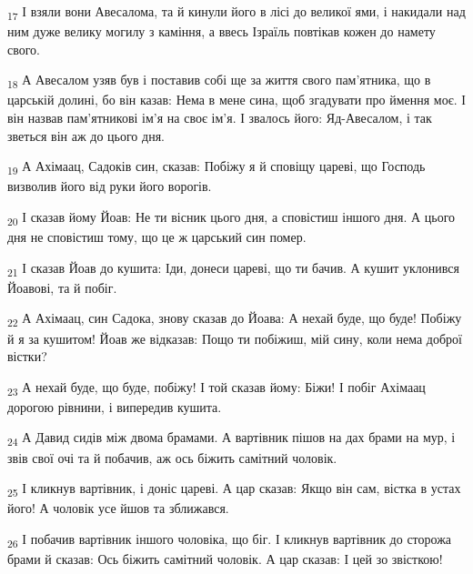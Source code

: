 \begin{tcolorbox}
\textsubscript{17} І взяли вони Авесалома, та й кинули його в лісі до великої ями, і накидали над ним дуже велику могилу з каміння, а ввесь Ізраїль повтікав кожен до намету свого.
\end{tcolorbox}
\begin{tcolorbox}
\textsubscript{18} А Авесалом узяв був і поставив собі ще за життя свого пам'ятника, що в царській долині, бо він казав: Нема в мене сина, щоб згадувати про ймення моє. І він назвав пам'ятникові ім'я на своє ім'я. І звалось його: Яд-Авесалом, і так зветься він аж до цього дня.
\end{tcolorbox}
\begin{tcolorbox}
\textsubscript{19} А Ахімаац, Садоків син, сказав: Побіжу я й сповіщу цареві, що Господь визволив його від руки його ворогів.
\end{tcolorbox}
\begin{tcolorbox}
\textsubscript{20} І сказав йому Йоав: Не ти вісник цього дня, а сповістиш іншого дня. А цього дня не сповістиш тому, що це ж царський син помер.
\end{tcolorbox}
\begin{tcolorbox}
\textsubscript{21} І сказав Йоав до кушита: Іди, донеси цареві, що ти бачив. А кушит уклонився Йоавові, та й побіг.
\end{tcolorbox}
\begin{tcolorbox}
\textsubscript{22} А Ахімаац, син Садока, знову сказав до Йоава: А нехай буде, що буде! Побіжу й я за кушитом! Йоав же відказав: Пощо ти побіжиш, мій сину, коли нема доброї вістки?
\end{tcolorbox}
\begin{tcolorbox}
\textsubscript{23} А нехай буде, що буде, побіжу! І той сказав йому: Біжи! І побіг Ахімаац дорогою рівнини, і випередив кушита.
\end{tcolorbox}
\begin{tcolorbox}
\textsubscript{24} А Давид сидів між двома брамами. А вартівник пішов на дах брами на мур, і звів свої очі та й побачив, аж ось біжить самітний чоловік.
\end{tcolorbox}
\begin{tcolorbox}
\textsubscript{25} І кликнув вартівник, і доніс цареві. А цар сказав: Якщо він сам, вістка в устах його! А чоловік усе йшов та зближався.
\end{tcolorbox}
\begin{tcolorbox}
\textsubscript{26} І побачив вартівник іншого чоловіка, що біг. І кликнув вартівник до сторожа брами й сказав: Ось біжить самітний чоловік. А цар сказав: І цей зо звісткою!
\end{tcolorbox}
